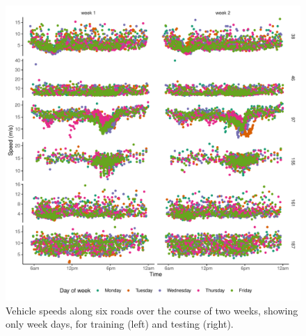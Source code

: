 \begin{knitrout}\small
{}\color{fgcolor}\begin{figure}

{\centering \includegraphics[width=\linewidth]{figure/tt_week1_load-1} 

}

\caption[Vehicle speeds along six roads over of two weeks.]{Vehicle speeds along six roads over the course of two weeks, showing only week days, for training (left) and testing (right).}\label{fig:tt_week1_load}
\end{figure}


\end{knitrout}

